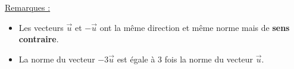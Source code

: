 \documentclass[12pt]{article}
\begin{document}
\vspace{10pt}

\underline{Remarques :} 
\vspace{5pt}
\begin{itemize}
    \item Les vecteurs $\overrightarrow{u}$ et 
    $-\overrightarrow{u}$ ont la même direction et même norme mais de \textbf{sens contraire}.
    \item La norme du vecteur $-3\overrightarrow{u}$ est égale à 3 fois la norme du 
    vecteur $\overrightarrow{u}$.
\end{itemize}

\vspace{10pt}

\end{document}
